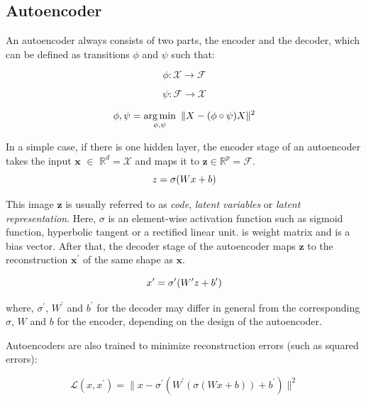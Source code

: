 \documentclass[conference]{IEEEtran}
\DeclareMathOperator*{\argmin}{arg\,min}
\begin{document}
\subsection{\label{sec:level3}	Autoencoder}

An autoencoder always consists of two parts, the encoder and the decoder, which can be defined 	as transitions $\phi$ and $\psi$ such that:

\begin{equation}
\phi : \mathcal{X} \to \mathcal{F}
\end{equation}

\begin{equation}
\psi : \mathcal{F} \to \mathcal{X}
\end{equation}

\begin{equation}
\phi , \psi = 
\argmin_{\phi,\psi}\ \| X - (\phi \circ \psi)X  \|^2\\
\end{equation}

In a simple case, if there is one hidden layer, the encoder stage of an autoencoder takes the input $\mathbf{x}$ $\in$ $\mathbb{R}^d = \mathcal{X}$ and maps it to $\mathbf{z} \in \mathbb{R}^p =\mathcal{F}  $.
\begin{equation}
\boldmath{z} = \sigma(Wx+b)
\end{equation}

This image $\mathbf {z} $  is usually referred to as \textit{code}, \textit{latent variables} or \textit{latent representation}. Here, $\sigma$ is an element-wise activation function such as sigmoid function, hyperbolic tangent or a rectified linear unit.  is weight matrix and  is a bias vector. After that, the decoder stage of the autoencoder maps $\mathbf{z}$ to the reconstruction $\mathbf{x^{\prime}}$ of the same shape as $\mathbf{x}$.

\begin{equation}
\boldmath{x^{\prime}} = \sigma^{\prime}(W^{\prime}z+b^{\prime})
\end{equation}

where, $\sigma^{\prime}$, $W^{\prime}$ and $b^{\prime}$ for the decoder may differ in general from the corresponding $\sigma$, $W$ and $b$ for the encoder, depending on the design of the autoencoder.

Autoencoders are also trained to minimize reconstruction errors (such as squared errors):

\begin{equation}
\mathcal{L}(x,x^{\prime}) = \|x- \sigma^{\prime}(W^{\prime}(\sigma(Wx+b))+b^{\prime})\|^2
\end{equation}
\end{document}
